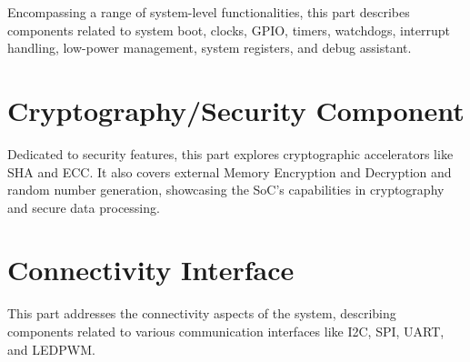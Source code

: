 \documentclass[openany, 10pt]{book}
\begin{document}

Encompassing a range of system-level functionalities, this part describes components related to system boot, clocks, GPIO, timers, watchdogs, interrupt handling, low-power management, system registers, and debug assistant.


\part{Cryptography/Security Component}

Dedicated to security features, this part explores cryptographic accelerators like SHA and ECC. It also covers external Memory Encryption and Decryption and random number generation, showcasing the SoC's capabilities in cryptography and secure data processing.





\part{Connectivity Interface}


This part addresses the connectivity aspects of the system, describing components related to various communication interfaces like I2C, SPI, UART, and LEDPWM.


\end{document}
